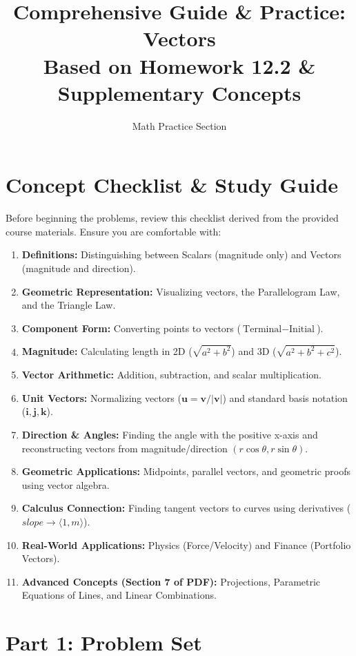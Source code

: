 \documentclass[12pt]{article}
\title{\textbf{Comprehensive Guide \& Practice: Vectors}\\ \large Based on Homework 12.2 \& Supplementary Concepts}
\author{Math Practice Section}
\date{}
\begin{document}
\maketitle

\section*{Concept Checklist & Study Guide}
Before beginning the problems, review this checklist derived from the provided course materials. Ensure you are comfortable with:

\begin{enumerate}
    \item \textbf{Definitions:} Distinguishing between Scalars (magnitude only) and Vectors (magnitude and direction).
    \item \textbf{Geometric Representation:} Visualizing vectors, the Parallelogram Law, and the Triangle Law.
    \item \textbf{Component Form:} Converting points to vectors ($\text{Terminal} - \text{Initial}$).
    \item \textbf{Magnitude:} Calculating length in 2D ($\sqrt{a^2+b^2}$) and 3D ($\sqrt{a^2+b^2+c^2}$).
    \item \textbf{Vector Arithmetic:} Addition, subtraction, and scalar multiplication.
    \item \textbf{Unit Vectors:} Normalizing vectors ($\mathbf{u} = \mathbf{v}/|\mathbf{v}|$) and standard basis notation ($\mathbf{i}, \mathbf{j}, \mathbf{k}$).
    \item \textbf{Direction \& Angles:} Finding the angle with the positive x-axis and reconstructing vectors from magnitude/direction $(r\cos\theta, r\sin\theta)$.
    \item \textbf{Geometric Applications:} Midpoints, parallel vectors, and geometric proofs using vector algebra.
    \item \textbf{Calculus Connection:} Finding tangent vectors to curves using derivatives ($slope \to \langle 1, m \rangle$).
    \item \textbf{Real-World Applications:} Physics (Force/Velocity) and Finance (Portfolio Vectors).
    \item \textbf{Advanced Concepts (Section 7 of PDF):} Projections, Parametric Equations of Lines, and Linear Combinations.
\end{enumerate}

\newpage

\section*{Part 1: Problem Set}
\end{document}
